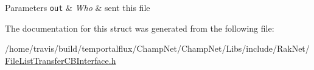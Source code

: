 \begin{DoxyParams}[1]{Parameters}
\mbox{\tt out}  & {\em Who} & sent this file \\
\hline
\end{DoxyParams}


The documentation for this struct was generated from the following file\-:\begin{DoxyCompactItemize}
\item 
/home/travis/build/temportalflux/\-Champ\-Net/\-Champ\-Net/\-Libs/include/\-Rak\-Net/\hyperlink{_file_list_transfer_c_b_interface_8h}{File\-List\-Transfer\-C\-B\-Interface.\-h}\end{DoxyCompactItemize}
